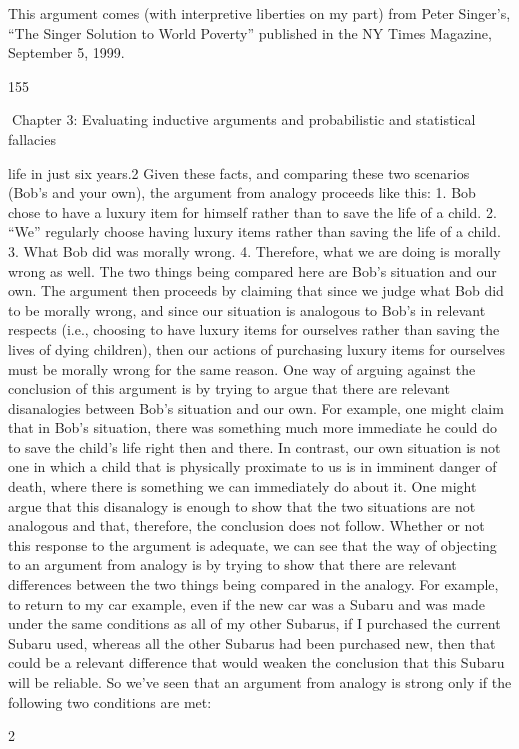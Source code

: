 This argument comes (with interpretive liberties on my part) from Peter Singer’s, “The Singer
Solution to World Poverty” published in the NY Times Magazine, September 5, 1999.

155

Chapter 3: Evaluating inductive arguments and probabilistic and statistical fallacies

life in just six years.2 Given these facts, and comparing these two scenarios
(Bob’s and your own), the argument from analogy proceeds like this:
1. Bob chose to have a luxury item for himself rather than to save the life
of a child.
2. “We” regularly choose having luxury items rather than saving the life
of a child.
3. What Bob did was morally wrong.
4. Therefore, what we are doing is morally wrong as well.
The two things being compared here are Bob’s situation and our own. The
argument then proceeds by claiming that since we judge what Bob did to be
morally wrong, and since our situation is analogous to Bob’s in relevant respects
(i.e., choosing to have luxury items for ourselves rather than saving the lives of
dying children), then our actions of purchasing luxury items for ourselves must
be morally wrong for the same reason.
One way of arguing against the conclusion of this argument is by trying to argue
that there are relevant disanalogies between Bob’s situation and our own. For
example, one might claim that in Bob’s situation, there was something much
more immediate he could do to save the child’s life right then and there. In
contrast, our own situation is not one in which a child that is physically proximate
to us is in imminent danger of death, where there is something we can
immediately do about it. One might argue that this disanalogy is enough to
show that the two situations are not analogous and that, therefore, the
conclusion does not follow. Whether or not this response to the argument is
adequate, we can see that the way of objecting to an argument from analogy is
by trying to show that there are relevant differences between the two things
being compared in the analogy. For example, to return to my car example,
even if the new car was a Subaru and was made under the same conditions as all
of my other Subarus, if I purchased the current Subaru used, whereas all the
other Subarus had been purchased new, then that could be a relevant difference
that would weaken the conclusion that this Subaru will be reliable.
So we’ve seen that an argument from analogy is strong only if the following two
conditions are met:

2

